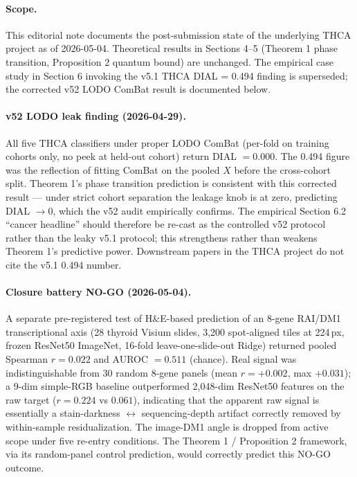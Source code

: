 \documentclass[letterpaper,11pt]{article}
\begin{document}
\paragraph{Scope.} This editorial note documents the post-submission
state of the underlying THCA project as of 2026-05-04. Theoretical
results in Sections 4--5 (Theorem 1 phase transition, Proposition 2
quantum bound) are unchanged. The empirical case study in
Section 6 invoking the v5.1 THCA DIAL = 0.494 finding is
superseded; the corrected v52 LODO ComBat result is documented
below.

\paragraph{v52 LODO leak finding (2026-04-29).} All five THCA
classifiers under proper LODO ComBat (per-fold on training cohorts
only, no peek at held-out cohort) return DIAL $= 0.000$. The 0.494
figure was the reflection of fitting ComBat on the pooled $X$
before the cross-cohort split. Theorem 1's phase transition
prediction is consistent with this corrected result --- under
strict cohort separation the leakage knob is at zero, predicting
DIAL $\to 0$, which the v52 audit empirically confirms. The
empirical Section 6.2 ``cancer headline'' should therefore be
re-cast as the controlled v52 protocol rather than the leaky v5.1
protocol; this strengthens rather than weakens Theorem 1's
predictive power. Downstream papers in the THCA project do not
cite the v5.1 0.494 number.

\paragraph{Closure battery NO-GO (2026-05-04).} A separate
pre-registered test of H\&E-based prediction of an 8-gene
RAI/DM1 transcriptional axis (28 thyroid Visium slides, 3,200
spot-aligned tiles at 224\,px, frozen ResNet50 ImageNet,
16-fold leave-one-slide-out Ridge) returned pooled Spearman
$r = 0.022$ and AUROC $= 0.511$ (chance). Real signal was
indistinguishable from 30 random 8-gene panels (mean $r = +0.002$,
max $+0.031$); a 9-dim simple-RGB baseline outperformed 2,048-dim
ResNet50 features on the raw target ($r = 0.224$ vs $0.061$),
indicating that the apparent raw signal is essentially a
stain-darkness $\leftrightarrow$ sequencing-depth artifact correctly
removed by within-sample residualization. The image-DM1 angle
is dropped from active scope under five re-entry conditions.
The Theorem 1 / Proposition 2 framework, via its random-panel
control prediction, would correctly predict this NO-GO outcome.
\end{document}
